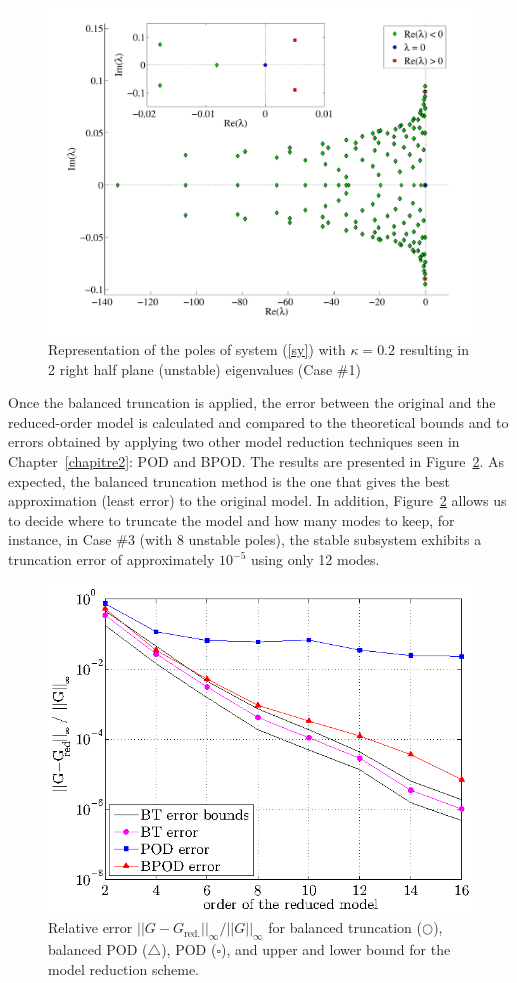 \documentclass[12pt,lot, lof]{puthesis}
\begin{document}
\begin{figure}[htbp]
	\centering
	\includegraphics [width=0.7\linewidth]{case1a} 
	\caption{Representation of the poles of system (\ref{sy}) with $\kappa=0.2$ resulting in 2 right half plane (unstable) eigenvalues (Case \#1)}
	\label{eigcase}
\end{figure}

Once the balanced truncation is applied, the error between the original and the reduced-order model is calculated and compared to the theoretical bounds and to errors obtained by applying two other model reduction techniques seen in Chapter~\ref{chapitre2}: POD and BPOD. The results are presented in Figure~\ref{errorBT}.
As expected, the balanced truncation method is the one that gives the best approximation (least error) to the original model.
In addition, Figure~\ref{errorBT} allows us to decide where to truncate the model and how many modes to keep, for instance, in Case \#3 (with 8 unstable poles), the stable subsystem exhibits a truncation error of approximately $10^{-5}$ using only 12 modes. 

\begin{figure}[htbp]
	\centering
	\includegraphics[width=0.7\linewidth]{error}
	\caption{Relative error $||G-G_\text{red.}||_{\infty} / ||G||_{\infty} $ for balanced truncation ($\bigcirc$), balanced POD ($\triangle$), POD ($\square$), and upper and lower bound for the model reduction scheme. }
	\label{errorBT}
\end{figure}
\end{document}
